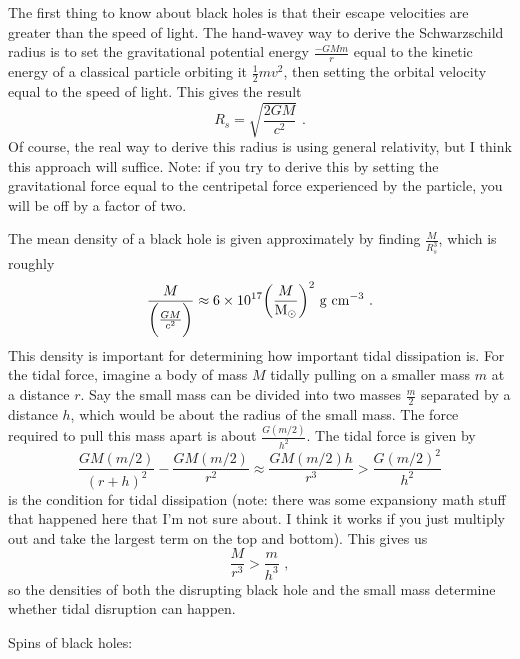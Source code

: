 The first thing to know about black holes is that their escape velocities are greater than the speed of light. The hand-wavey way to derive the Schwarzschild radius is to set the gravitational potential energy $\frac{-G Mm}{r}$ equal to the kinetic energy of a classical particle orbiting it $\frac{1}{2}m v^2$, then setting the orbital velocity equal to the speed of light. This gives the result
\begin{equation}
R_s = \sqrt{\frac{2GM}{c^2}}\,\,.
\end{equation}
Of course, the real way to derive this radius is using general relativity, but I think this approach will suffice. Note: if you try to derive this by setting the gravitational force equal to the centripetal force experienced by the particle, you will be off by a factor of two.

The mean density of a black hole is given approximately by finding $\frac{M}{R_s^3}$, which is roughly
\begin{equation}
\frac{M}{\biggl( \frac{GM}{c^2} \biggr)} \approx 6 \times 10^{17} \biggl(\frac{M}{{\rm M}_\odot} \biggr)^2~{\rm g}~{\rm cm}^{-3}\,\,.
\end{equation}
This density is important for determining how important tidal dissipation is. For the tidal force, imagine a body of mass $M$ tidally pulling on a smaller mass $m$ at a distance $r$. Say the small mass can be divided into two masses $\frac{m}{2}$ separated by a distance $h$, which would be about the radius of the small mass. The force required to pull this mass apart is about $\frac{G (m/2)}{h^2}$. The tidal force is given by
\begin{equation}
\frac{GM(m/2)}{(r + h)^2} - \frac{GM(m/2)}{r^2} \approx \frac{GM(m/2)h}{r^3} > \frac{G(m/2)^2}{h^2}
\end{equation}
is the condition for tidal dissipation (note: there was some expansiony math stuff that happened here that I'm not sure about. I think it works if you just multiply out and take the largest term on the top and bottom). This gives us
\begin{equation}
\frac{M}{r^3} > \frac{m}{h^3}\,\,,
\end{equation}
so the densities of both the disrupting black hole and the small mass determine whether tidal disruption can happen.

Spins of black holes:

